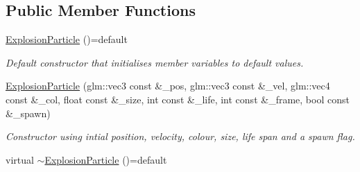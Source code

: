 \subsection*{Public Member Functions}
\begin{DoxyCompactItemize}
\item 
\hypertarget{classExplosionParticle_a2175ab3a5622c59880a5e087ee113b43}{\hyperlink{classExplosionParticle_a2175ab3a5622c59880a5e087ee113b43}{Explosion\-Particle} ()=default}\label{classExplosionParticle_a2175ab3a5622c59880a5e087ee113b43}

\begin{DoxyCompactList}\small\item\em Default constructor that initialises member variables to default values. \end{DoxyCompactList}\item 
\hyperlink{classExplosionParticle_a1f80155f7d52d00d04c614baa55aefac}{Explosion\-Particle} (glm\-::vec3 const \&\-\_\-pos, glm\-::vec3 const \&\-\_\-vel, glm\-::vec4 const \&\-\_\-col, float const \&\-\_\-size, int const \&\-\_\-life, int const \&\-\_\-frame, bool const \&\-\_\-spawn)
\begin{DoxyCompactList}\small\item\em Constructor using intial position, velocity, colour, size, life span and a spawn flag. \end{DoxyCompactList}\item 
\hypertarget{classExplosionParticle_aeb7b8dd431a766a92442540a5b876e03}{virtual \hyperlink{classExplosionParticle_aeb7b8dd431a766a92442540a5b876e03}{$\sim$\-Explosion\-Particle} ()=default}\label{classExplosionParticle_aeb7b8dd431a766a92442540a5b876e03}


\end{DoxyCompactItemize}
